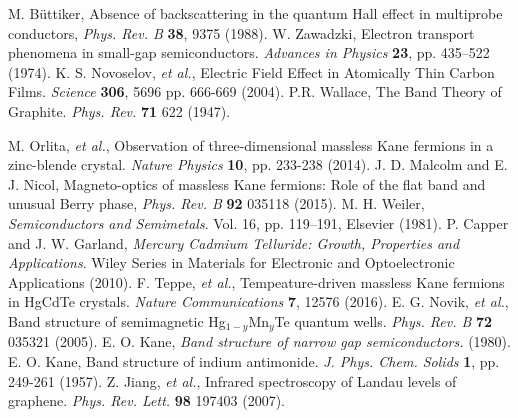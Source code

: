 \documentclass[titlepage,a4paper]{book}
\begin{document}
\begin{thebibliography}{99}
M. Büttiker, Absence of backscattering in the quantum Hall effect in multiprobe conductors, \textit{Phys. Rev. B} \textbf{38}, 9375 (1988).
W. Zawadzki, Electron transport phenomena in small-gap semiconductors. \textit{Advances in Physics} \textbf{23}, pp. 435–522 (1974).
K. S. Novoselov, \textit{et al.}, Electric Field Effect in Atomically Thin Carbon Films. \textit{Science} \textbf{306}, 5696 pp. 666-669 (2004).
P.R. Wallace, The Band Theory of Graphite. \textit{Phys. Rev.} \textbf{71} 622 (1947).

M. Orlita, \textit{et al.}, Observation of three-dimensional massless Kane fermions in a zinc-blende crystal. \textit{Nature Physics} \textbf{10}, pp. 233-238 (2014).
J. D. Malcolm and E. J. Nicol, Magneto-optics of massless Kane fermions: Role of the flat band and unusual Berry phase, \textit{Phys. Rev. B} \textbf{92} 035118 (2015).
M. H. Weiler, \textit{Semiconductors and Semimetals}. Vol. 16, pp. 119–191, Elsevier (1981).
P. Capper and J. W. Garland, \textit{Mercury Cadmium Telluride: Growth, Properties and Applications}. Wiley Series in Materials for Electronic and Optoelectronic Applications (2010).
F. Teppe, \textit{et al.}, Tempeature-driven massless Kane fermions in HgCdTe crystals. \textit{Nature Communications} \textbf{7}, 12576 (2016).
E. G. Novik, \textit{et al.}, Band structure of semimagnetic Hg$_{1-y}$Mn$_y$Te quantum wells. \textit{Phys. Rev. B} \textbf{72} 035321 (2005).
E. O. Kane, \textit{Band structure of narrow gap semiconductors.} (1980).
E. O. Kane, Band structure of indium antimonide. \textit{J. Phys. Chem. Solids} \textbf{1}, pp. 249-261 (1957).
Z. Jiang, \textit{et al.}, Infrared spectroscopy of Landau levels of graphene. \textit{Phys. Rev. Lett.} \textbf{98} 197403 (2007).



\end{thebibliography}
\end{document}

